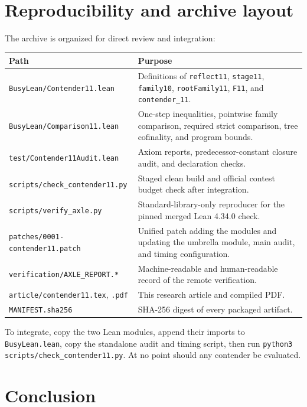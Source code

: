 \documentclass[11pt]{article}
\theoremstyle{definition}
\theoremstyle{remark}
\newcommand{\lean}[1]{\texttt{#1}}
\begin{document}
\section{Reproducibility and archive layout}

The archive is organized for direct review and integration:
\begin{longtable}{@{}p{}p{}@{}}
\toprule
Path & Purpose \\
\midrule
\endhead
\lean{BusyLean/Contender11.lean} & Definitions of \lean{reflect11},
\lean{stage11}, \lean{family10}, \lean{rootFamily11}, \lean{F11}, and
\lean{contender\_11}. \\
\lean{BusyLean/Comparison11.lean} & One-step inequalities, pointwise family
comparison, required strict comparison, tree cofinality, and program bounds. \\
\lean{test/Contender11Audit.lean} & Axiom reports, predecessor-constant closure
audit, and declaration checks. \\
\lean{scripts/check\_contender11.py} & Staged clean build and official contest
budget check after integration. \\
\lean{scripts/verify\_axle.py} & Standard-library-only reproducer for the
pinned merged Lean 4.34.0 check. \\
\lean{patches/0001-contender11.patch} & Unified patch adding the modules and
updating the umbrella module, main audit, and timing configuration. \\
\lean{verification/AXLE\_REPORT.*} & Machine-readable and human-readable record
of the remote verification. \\
\lean{article/contender11.tex}, \lean{.pdf} & This research article and compiled
PDF. \\
\lean{MANIFEST.sha256} & SHA-256 digest of every packaged artifact. \\
\bottomrule
\end{longtable}

To integrate, copy the two Lean modules, append their imports to
\lean{BusyLean.lean}, copy the standalone audit and timing script, then run
\lean{python3 scripts/check\_contender11.py}.  At no point should any contender
be evaluated.

\section{Conclusion}
\end{document}
